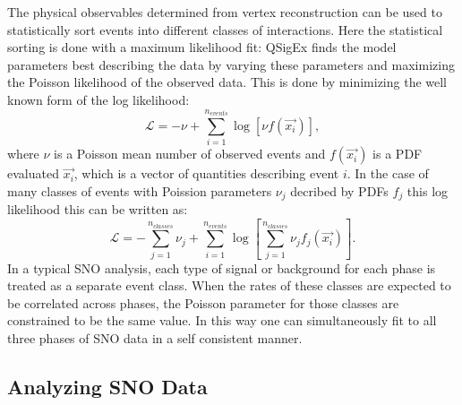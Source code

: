 The physical observables determined from vertex reconstruction can be used to statistically sort events into different classes of interactions.
Here the statistical sorting is done with a maximum likelihood fit: QSigEx finds the model parameters best describing the data by varying these parameters and maximizing the Poisson likelihood of the observed data.
This is done by minimizing the well known form of the log likelihood:
\begin{equation}
    \mathcal{L} = -\nu + \sum_{i=1}^{n_{events}} \log \left[ \nu f(\vec{x_i}) \right],
\end{equation}
where $\nu$ is a Poisson mean number of observed events and $f(\vec{x_i})$ is a PDF evaluated $\vec{x_i}$, which is a vector of quantities describing event $i$.
In the case of many classes of events with Poission parameters $\nu_j$ decribed by PDFs $f_j$ this log likelihood this can be written as:
\begin{equation}
    \mathcal{L} = -\sum_{j=1}^{n_{classes}} \nu_j + \sum_{i=1}^{n_{events}} \log \left[ \sum_{j=1}^{n_{classes}} \nu_j f_j(\vec{x_i}) \right].
\end{equation}
In a typical SNO analysis, each type of signal or background for each phase is treated as a separate event class.
When the rates of these classes are expected to be correlated across phases, the Poisson parameter for those classes are constrained to be the same value.
In this way one can simultaneously fit to all three phases of SNO data in a self consistent manner.

\subsection{Analyzing SNO Data}
\label{sec:sno_observables}

